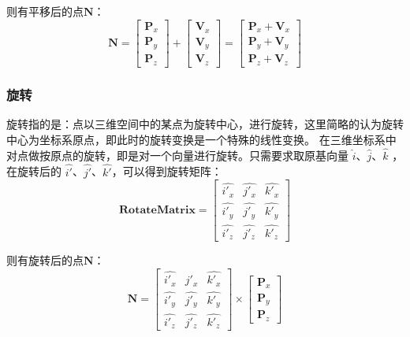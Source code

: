 \documentclass[12pt,oneside,a4paper]{ctexart}
\begin{document}
则有平移后的点$\mathbf{N}$：
\begin{equation*}
	\mathbf{N}=
	\begin{bmatrix}
		\mathbf{P}_x \\
		\mathbf{P}_y \\
		\mathbf{P}_z
	\end{bmatrix}+\begin{bmatrix}
		\mathbf{V}_x \\
		\mathbf{V}_y \\
		\mathbf{V}_z
	\end{bmatrix} =
	\begin{bmatrix}
		\mathbf{P}_x + \mathbf{V}_x \\
		\mathbf{P}_y + \mathbf{V}_y \\
		\mathbf{P}_z + \mathbf{V}_z
	\end{bmatrix}
\end{equation*}
\subsubsection{旋转}
旋转指的是：点以三维空间中的某点为旋转中心，进行旋转，这里简略的认为旋转中心为坐标系原点，即此时的旋转变换是一个特殊的线性变换。
在三维坐标系中对点做按原点的旋转，即是对一个向量进行旋转。只需要求取原基向量 $\hat{i}$、$\hat{j}$、$\hat{k}$ ，在旋转后的 $\hat{i'}$、$\hat{j'}$、$\hat{k'}$，可以得到旋转矩阵：
\begin{equation*}
	\mathbf{RotateMatrix} =
	\begin{bmatrix}
		\hat{i'_x} & \hat{j'_x} & \hat{k'_x} \\
		\hat{i'_y} & \hat{j'_y} & \hat{k'_y} \\
		\hat{i'_z} & \hat{j'_z} & \hat{k'_z}
	\end{bmatrix}
\end{equation*}

则有旋转后的点$\mathbf{N}$：
\begin{equation*}
	\mathbf{N} = \begin{bmatrix}
		\hat{i'_x} & \hat{j'_x} & \hat{k'_x} \\
		\hat{i'_y} & \hat{j'_y} & \hat{k'_y} \\
		\hat{i'_z} & \hat{j'_z} & \hat{k'_z}
	\end{bmatrix} \times \begin{bmatrix}
		\mathbf{P}_x \\
		\mathbf{P}_y \\
		\mathbf{P}_z
	\end{bmatrix}
\end{equation*}
\end{document}
